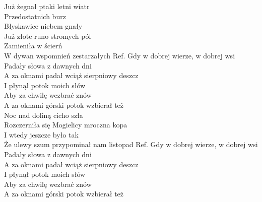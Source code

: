 
Już żegnał ptaki letni wiatr \tab{} \\
Przedostatnich burz \tab{} \\
Błyskawice niebem gnały \tab{} \\
\hop
Już złote runo stromych pól \tab{}  \\
Zamieniła w ścierń \tab{} \\
W dywan wspomnień zestarzałych 
\hops
Ref. Gdy w dobrej wierze, w dobrej wsi \tab{} \\
 Padały słowa z dawnych dni \tab{} \\
 A za oknami padał wciąż sierpniowy deszcz  \\
 I płynął potok moich słów \tab{} \\
 Aby za chwilę wezbrać znów \tab{} \\
 A za oknami górski potok wzbierał też\tab{} \\
\hops
Noc nad doliną cicho szła \\
Rozczerniła się Mogielicy mroczna kopa \\
I wtedy jeszcze było tak \\
Że ulewy szum przypominał nam listopad 
\hops
Ref. Gdy w dobrej wierze, w dobrej wsi\\
 Padały słowa z dawnych dni\\
 A za oknami padał wciąż sierpniowy deszcz\\
 I płynął potok moich słów\\
 Aby za chwilę wezbrać znów\\
 A za oknami górski potok wzbierał też
